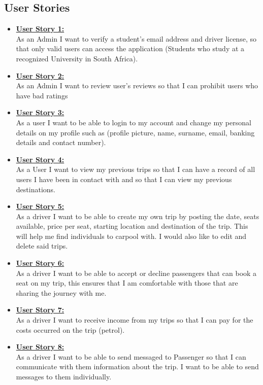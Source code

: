 \documentclass[hidelinks, 12pt, a4paper]{article}
\begin{document}
\subsection{User Stories}
\begin{itemize}
      \item \textbf{\underline{User Story 1: }}\\
            As an Admin I want to verify a student's email address and driver license, so that only valid users can access the application (Students who study at a recognized University in South Africa).
      \item \textbf{\underline{User Story 2: }} \\
            As an Admin I want to review user's reviews so that I can prohibit users who have bad ratings
      \item \textbf{\underline{User Story 3: }} \\
            As a user I want to be able to login to my account and change my personal details on my profile such as (profile picture, name, surname, email, banking details and contact number).
      \item \textbf{\underline{User Story 4: }} \\
            As a User I want to view my previous trips so that I can have a record of all users I have been in contact with and so that I can view my previous destinations.
      \item \textbf{\underline{User Story 5: }} \\
            As a driver I want to be able to create my own trip by posting the date, seats available, price per seat, starting location and destination of the trip. This will help me find individuals to carpool with. I would also like to edit and delete said trips.
      \item \textbf{\underline{User Story 6: }}\\
            As a driver I want to be able to accept or decline passengers that can book a seat on my trip, this ensures that I am comfortable with those that are sharing the journey with me.
      \item \textbf{\underline{User Story 7: }} \\
            As a driver I want to receive income from my trips so that I can pay for the costs occurred on the trip (petrol).
      \item \textbf{\underline{User Story 8: }} \\
            As a driver I want to be able to send messaged to Passenger so that I can communicate with them information about the trip. I want to be able to send messages to them individually.

\end{itemize}
\end{document}

